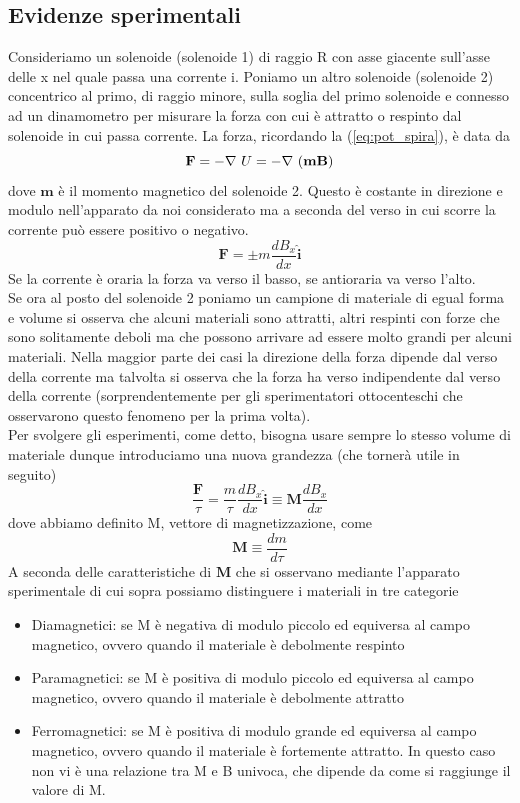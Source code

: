 \documentclass[
10pt, %
a4paper, %
oneside, %
headinclude,footinclude, %
BCOR5mm, %
]{scrartcl}
\begin{document}
\subsection{Evidenze sperimentali}
Consideriamo un solenoide (solenoide 1) di raggio R con asse giacente sull'asse delle x nel quale passa una corrente i. Poniamo un altro solenoide (solenoide 2) concentrico al primo, di raggio minore, sulla soglia del primo solenoide e connesso ad un dinamometro per misurare la forza con cui è attratto o respinto dal solenoide in cui passa corrente. La forza, ricordando la (\ref{eq:pot_spira}), è data da 
\[\mathbf{F} = -\nabla\  U = -\nabla\ (\mathbf{m}\mathbf{B})\]
dove \(\mathbf{m}\) è il momento magnetico del solenoide 2. Questo è costante in direzione e modulo nell'apparato da noi considerato ma a seconda del verso in cui scorre la corrente può essere positivo o negativo.
\[\mathbf{F}=\pm m \frac{d B_x}{dx}\mathbf{\hat{i}}\]
Se la corrente è oraria la forza va verso il basso, se antioraria va verso l'alto.\\
Se ora al posto del solenoide 2 poniamo un campione di materiale di egual forma e volume si osserva che alcuni materiali sono attratti, altri respinti con forze che sono solitamente deboli ma che possono arrivare ad essere molto grandi per alcuni materiali. Nella maggior parte dei casi la direzione della forza dipende dal verso della corrente ma talvolta si osserva che la forza ha verso indipendente dal verso della corrente (sorprendentemente per gli sperimentatori ottocenteschi che osservarono questo fenomeno per la prima volta).\\
Per svolgere gli esperimenti, come detto, bisogna usare sempre lo stesso volume di materiale dunque introduciamo una nuova grandezza (che tornerà utile in seguito)
\[\frac{\mathbf{F}}{\tau} = \frac{m}{\tau}\frac{d B_x}{dx}\mathbf{\hat{i}}\equiv \mathbf{M}\frac{dB_x}{dx}\]
dove abbiamo definito M, vettore di magnetizzazione, come
\[\mathbf{M}\equiv \frac{dm}{d\tau}\]
A seconda delle caratteristiche di \(\mathbf{M}\) che si osservano mediante l'apparato sperimentale di cui sopra possiamo distinguere i materiali in tre categorie
\begin{itemize}
	\item Diamagnetici: se M è negativa di modulo piccolo ed equiversa al campo magnetico, ovvero quando il materiale è debolmente respinto
	\item Paramagnetici: se M è positiva di modulo piccolo ed equiversa al campo magnetico, ovvero quando il materiale è debolmente attratto
	\item Ferromagnetici: se M è positiva di modulo grande ed equiversa al campo magnetico, ovvero quando il materiale è fortemente attratto. In questo caso non vi è una relazione tra M e B univoca, che dipende da come si raggiunge il valore di M. 
\end{itemize}
\end{document}
